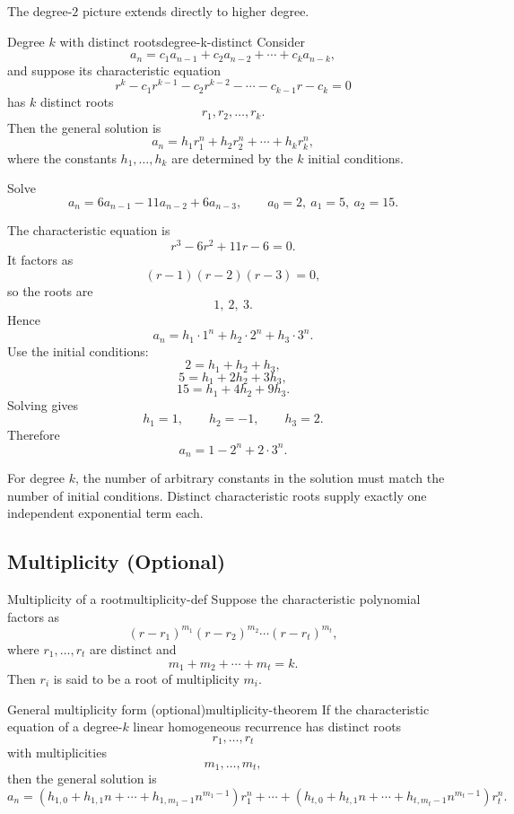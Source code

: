 The degree-$2$ picture extends directly to higher degree.

\begin{theorem}{Degree $k$ with distinct roots}{degree-k-distinct}
Consider
\[
a_n=c_1a_{n-1}+c_2a_{n-2}+\cdots+c_ka_{n-k},
\]
and suppose its characteristic equation
\[
r^k-c_1r^{k-1}-c_2r^{k-2}-\cdots-c_{k-1}r-c_k=0
\]
has $k$ distinct roots
\[
r_1,r_2,\dots,r_k.
\]
Then the general solution is
\[
a_n=h_1r_1^n+h_2r_2^n+\cdots+h_kr_k^n,
\]
where the constants $h_1,\dots,h_k$ are determined by the $k$ initial conditions.
\end{theorem}

\begin{examplebox}[title={Example 6 from the handout}]
Solve
\[
a_n=6a_{n-1}-11a_{n-2}+6a_{n-3},
\qquad
a_0=2,\ a_1=5,\ a_2=15.
\]

The characteristic equation is
\[
r^3-6r^2+11r-6=0.
\]
It factors as
\[
(r-1)(r-2)(r-3)=0,
\]
so the roots are
\[
1,\ 2,\ 3.
\]
Hence
\[
a_n=h_1\cdot 1^n+h_2\cdot 2^n+h_3\cdot 3^n.
\]
Use the initial conditions:
\[
2=h_1+h_2+h_3,
\]
\[
5=h_1+2h_2+3h_3,
\]
\[
15=h_1+4h_2+9h_3.
\]
Solving gives
\[
h_1=1,\qquad h_2=-1,\qquad h_3=2.
\]
Therefore
\[
\boxed{a_n=1-2^n+2\cdot 3^n.}
\]
\end{examplebox}

\begin{examtip}[title={Higher-degree structure}]
For degree $k$, the number of arbitrary constants in the solution must match the number of initial conditions. Distinct characteristic roots supply exactly one independent exponential term each.
\end{examtip}

\subsection{Multiplicity (Optional)}

\begin{definition}{Multiplicity of a root}{multiplicity-def}
Suppose the characteristic polynomial factors as
\[
(r-r_1)^{m_1}(r-r_2)^{m_2}\cdots(r-r_t)^{m_t},
\]
where $r_1,\dots,r_t$ are distinct and
\[
m_1+m_2+\cdots+m_t=k.
\]
Then $r_i$ is said to be a root of multiplicity $m_i$.
\end{definition}

\begin{theorem}{General multiplicity form (optional)}{multiplicity-theorem}
If the characteristic equation of a degree-$k$ linear homogeneous recurrence has distinct roots
\[
r_1,\dots,r_t
\]
with multiplicities
\[
m_1,\dots,m_t,
\]
then the general solution is
\[
a_n=
(h_{1,0}+h_{1,1}n+\cdots+h_{1,m_1-1}n^{m_1-1})r_1^n
+\cdots+
(h_{t,0}+h_{t,1}n+\cdots+h_{t,m_t-1}n^{m_t-1})r_t^n.
\]
\end{theorem}

